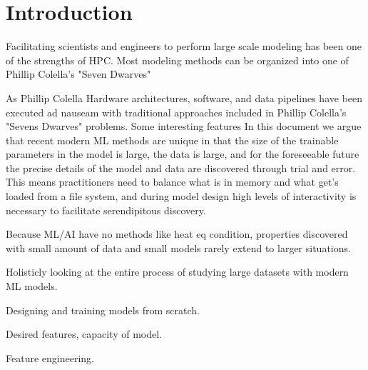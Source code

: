 \section{Introduction}

Facilitating scientists and engineers to perform large scale modeling has been one of the strengths of HPC. Most modeling methods can be organized into one of Phillip Colella's "Seven Dwarves"

 As Phillip Colella Hardware architectures, software, and data pipelines have been executed ad nauseam with traditional approaches included in Phillip Colella's "Sevens Dwarves" problems. Some interesting features 
In this document we argue that recent modern ML methods are unique in that the size of the trainable parameters in the model is large, the data is large, and for the foreseeable future the precise details of the model and data are discovered through trial and error. This means practitioners need to balance what is in memory and what get's loaded from a file system, and during model design high levels of interactivity is necessary to facilitate serendipitous discovery.

Because ML/AI have no methods like heat eq condition, properties discovered with small amount of data and small models rarely extend to larger situations.


Holisticly looking at the entire process of studying large datasets with modern ML models.

Designing and training models from scratch.

Desired features, capacity of model.

Feature engineering.